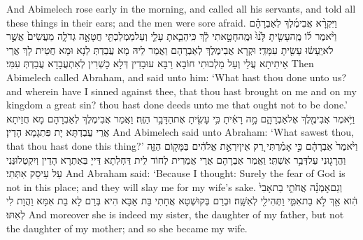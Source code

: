 {And Abimelech rose early in the morning, and called all his servants, and told all these things in their ears; and the men were sore afraid.}{}
{וַיִּקְרָ֨א אֲבִימֶ֜לֶךְ לְאַבְרָהָ֗ם וַיֹּ֨אמֶר ל֜וֹ מֶֽה\maqqaf עָשִׂ֤יתָ לָּ֙נוּ֙ וּמֶֽה\maqqaf חָטָ֣אתִי לָ֔ךְ כִּֽי\maqqaf הֵבֵ֧אתָ עָלַ֛י וְעַל\maqqaf מַמְלַכְתִּ֖י חֲטָאָ֣ה גְדֹלָ֑ה מַעֲשִׂים֙ אֲשֶׁ֣ר לֹא\maqqaf יֵֽעָשׂ֔וּ עָשִׂ֖יתָ עִמָּדִֽי׃}
{וּקְרָא אֲבִימֶלֶךְ לְאַבְרָהָם וַאֲמַר לֵיהּ מָא עֲבַדְתְּ לַנָא וּמָא חֲטֵית לָךְ אֲרֵי אֵיתִיתָא עֲלַי וְעַל מַלְכוּתִי חוֹבָא רַבָּא עוּבָדִין דְּלָא כָשְׁרִין לְאִתְעֲבָדָא עֲבַדְתְּ עִמִּי׃}
{Then Abimelech called Abraham, and said unto him: ‘What hast thou done unto us? and wherein have I sinned against thee, that thou hast brought on me and on my kingdom a great sin? thou hast done deeds unto me that ought not to be done.’}{}
{וַיֹּ֥אמֶר אֲבִימֶ֖לֶךְ אֶל\maqqaf אַבְרָהָ֑ם מָ֣ה רָאִ֔יתָ כִּ֥י עָשִׂ֖יתָ אֶת\maqqaf הַדָּבָ֥ר הַזֶּֽה׃}
{וַאֲמַר אֲבִימֶלֶךְ לְאַבְרָהָם מָא חֲזֵיתָא אֲרֵי עֲבַדְתָּא יָת פִּתְגָמָא הָדֵין׃}
{And Abimelech said unto Abraham: ‘What sawest thou, that thou hast done this thing?’}{}
{וַיֹּ֙אמֶר֙ אַבְרָהָ֔ם כִּ֣י אָמַ֗רְתִּי רַ֚ק אֵין\maqqaf יִרְאַ֣ת אֱלֹהִ֔ים בַּמָּק֖וֹם הַזֶּ֑ה וַהֲרָג֖וּנִי עַל\maqqaf דְּבַ֥ר אִשְׁתִּֽי׃}
{וַאֲמַר אַבְרָהָם אֲרֵי אֲמַרִית לְחוֹד לֵית דַּחְלְתָא דַּייָ בְּאַתְרָא הָדֵין וְיִקְטְלוּנַּנִי עַל עֵיסַק אִתְּתִי׃}
{And Abraham said: ‘Because I thought: Surely the fear of God is not in this place; and they will slay me for my wife’s sake.}{}
{וְגַם\maqqaf אׇמְנָ֗ה אֲחֹתִ֤י בַת\maqqaf אָבִי֙ הִ֔וא אַ֖ךְ לֹ֣א בַת\maqqaf אִמִּ֑י וַתְּהִי\maqqaf לִ֖י לְאִשָּֽׁה׃}
{וּבְרַם בְּקוּשְׁטָא אֲחָתִי בַּת אַבָּא הִיא בְּרַם לָא בַת אִמָּא וַהֲוָת לִי לְאִתּוּ׃}
{And moreover she is indeed my sister, the daughter of my father, but not the daughter of my mother; and so she became my wife.}{}
